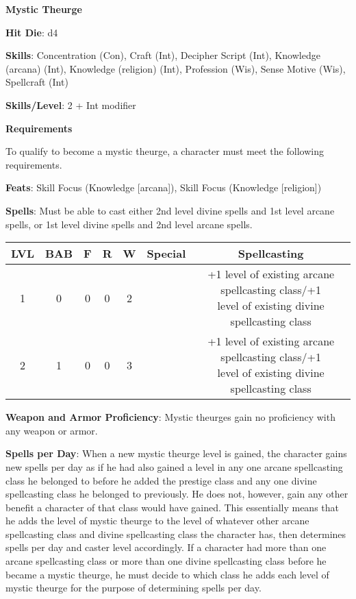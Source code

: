\textbf{\huge{Mystic Theurge}}

\textbf{Hit Die}: d4

\textbf{Skills}: Concentration (Con), Craft (Int), Decipher Script (Int), Knowledge (arcana) (Int), Knowledge (religion) (Int), Profession (Wis), Sense Motive (Wis), Spellcraft (Int)

\textbf{Skills/Level}: 2 + Int modifier

\textbf{\large{Requirements}}

To qualify to become a mystic theurge, a character must meet the following requirements.

\textbf{Feats}: Skill Focus (Knowledge [arcana]), Skill Focus (Knowledge [religion])

\textbf{Spells}: Must be able to cast either 2nd level divine spells and 1st level arcane spells, or 1st level divine spells and 2nd level arcane spells.

\begin{center}
\begin{adjustwidth}{-4cm}{}
\begin{small}
\begin{tabular}{| c | c | c | c | c | c | c |}
\hline
LVL &BAB &F &R &W &Special &Spellcasting \\
\hline
1 &0 &0 &0 &2 & &\makecell{+1 level of existing arcane spellcasting class/+1\\ level of existing divine spellcasting class} \\
2 &1 &0 &0 &3 & &\makecell{+1 level of existing arcane spellcasting class/+1\\ level of existing divine spellcasting class} \\
\hline
\end{tabular}
\end{small}
\end{adjustwidth}
\end{center}

\textbf{Weapon and Armor Proficiency}: Mystic theurges gain no proficiency with any weapon or armor.

\textbf{Spells per Day}: When a new mystic theurge level is gained, the character gains new spells per day as if he had also gained a level in any one arcane spellcasting class he belonged to before he added the prestige class and any one divine spellcasting class he belonged to previously. He does not, however, gain any other benefit a character of that class would have gained. This essentially means that he adds the level of mystic theurge to the level of whatever other arcane spellcasting class and divine spellcasting class the character has, then determines spells per day and caster level accordingly. If a character had more than one arcane spellcasting class or more than one divine spellcasting class before he became a mystic theurge, he must decide to which class he adds each level of mystic theurge for the purpose of determining spells per day.